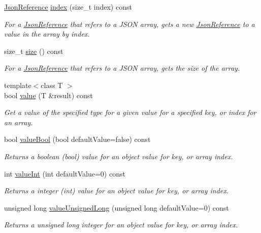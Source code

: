 \begin{DoxyCompactItemize}
\hyperlink{class_json_reference}{Json\+Reference} \hyperlink{class_json_reference_aecf18512e22e7efeba7572072576e09e}{index} (size\+\_\+t index) const
\begin{DoxyCompactList}\small\item\em For a \hyperlink{class_json_reference}{Json\+Reference} that refers to a J\+S\+ON array, gets a new \hyperlink{class_json_reference}{Json\+Reference} to a value in the array by index. \end{DoxyCompactList}\item 
size\+\_\+t \hyperlink{class_json_reference_a9a196b64764b2943c425cee334f0b999}{size} () const
\begin{DoxyCompactList}\small\item\em For a \hyperlink{class_json_reference}{Json\+Reference} that refers to a J\+S\+ON array, gets the size of the array. \end{DoxyCompactList}\item 
{\footnotesize template$<$class T $>$ }\\bool \hyperlink{class_json_reference_a9eb0bbb4ed98e7ebceeb41c757e0f15b}{value} (T \&result) const
\begin{DoxyCompactList}\small\item\em Get a value of the specified type for a given value for a specified key, or index for an array. \end{DoxyCompactList}\item 
bool \hyperlink{class_json_reference_a45d8e15942d4f3cf79e6e7d0c9218acf}{value\+Bool} (bool default\+Value=false) const
\begin{DoxyCompactList}\small\item\em Returns a boolean (bool) value for an object value for key, or array index. \end{DoxyCompactList}\item 
int \hyperlink{class_json_reference_afcf4b05a4b789ca1ea938a1adb33cafa}{value\+Int} (int default\+Value=0) const
\begin{DoxyCompactList}\small\item\em Returns a integer (int) value for an object value for key, or array index. \end{DoxyCompactList}\item 
unsigned long \hyperlink{class_json_reference_a081b56c80097d802911610fb17253211}{value\+Unsigned\+Long} (unsigned long default\+Value=0) const
\begin{DoxyCompactList}\small\item\em Returns a unsigned long integer for an object value for key, or array index. \end{DoxyCompactList}\item 

\end{DoxyCompactItemize}
